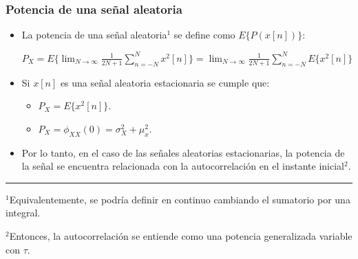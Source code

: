 \documentclass{beamer}
\numberwithin{section}{part}
\begin{document}
\begin{frame}
  \frametitle{Potencia de una señal aleatoria}
    \vspace{-0.2cm}
    \footnotesize
    \begin{itemize}
    \item La potencia de una señal aleatoria$^1$ se define como $E\{P(x[n])\}$:
    
    $P_X=E\{\lim_{N \rightarrow \infty } \frac{1}{2N+1}\sum_{n=-N}^{N} x^2[n]\}=\lim_{N \rightarrow \infty } \frac{1}{2N+1} \sum_{n=-N}^{N} E\{x^2[n]\}$
    
    \item Si $x[n]$ es una señal aleatoria estacionaria se cumple que:
    
    \begin{itemize}
      \footnotesize
      \item $P_X=E\{x^2[n]\}$.
      \item $P_X=\phi_{XX}(0)=\sigma^2_X+\mu_x^2$.
    \end{itemize}
    
  
    \item Por lo tanto, en el caso de las señales aleatorias estacionarias, la potencia de la señal se encuentra relacionada con la autocorrelación en el instante inicial$^2$. 
  \end{itemize}
  
  
  \rule{11cm}{0.04ex}
  \scriptsize
  $^1$Equivalentemente, se podría definir en continuo cambiando el sumatorio por una integral.
  
  \vspace{0.1cm}
  $^2$Entonces, la autocorrelación se entiende como una potencia generalizada variable con $\tau$.
\end{frame}
  
\end{document}
